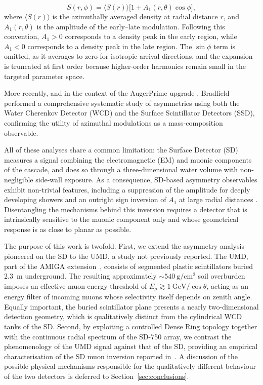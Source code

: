\documentclass[11pt,a4paper]{article}
\begin{document}
\begin{equation}
    S(r, \phi) = \langle S(r)\rangle \big[ 1 + A_1(r, \theta) \cos \phi \big] ,
    \label{eq:harmonic_fit}
\end{equation}
%
where $\langle S(r)\rangle$ is the azimuthally averaged density at radial distance $r$, and $A_1(r, \theta)$ is the amplitude of the early--late modulation. Following this convention, $A_1 > 0$ corresponds to a density peak in the early region, while $A_1 < 0$ corresponds to a density peak in the late region. The $\sin \phi$ term is omitted, as it averages to zero for isotropic arrival directions, and the expansion is truncated at first order because higher-order harmonics remain small in the targeted parameter space.

More recently, and in the context of the AugerPrime upgrade \cite{AugerPrime2016}, Bradfield \cite{BradfieldThesis} performed a comprehensive systematic study of asymmetries using both the Water Cherenkov Detector (WCD) and the Surface Scintillator Detectors (SSD), confirming the utility of azimuthal modulations as a mass-composition observable.

All of these analyses share a common limitation: the Surface Detector (SD) measures a signal combining the electromagnetic (EM) and muonic components of the cascade, and does so through a three-dimensional water volume with non-negligible side-wall exposure. As a consequence, SD-based asymmetry observables exhibit non-trivial features, including a suppression of the amplitude for deeply developing showers and an outright sign inversion of $A_1$ at large radial distances \cite{BradfieldThesis, Luce_ICRC2021, GAP2000_017}. Disentangling the mechanisms behind this inversion requires a detector that is intrinsically sensitive to the muonic component only and whose geometrical response is as close to planar as possible.

The purpose of this work is twofold. First, we extend the asymmetry analysis pioneered on the SD to the UMD, a study not previously reported. The UMD, part of the AMIGA extension~\cite{Botti2019, auger2020umd_infill}, consists of segmented plastic scintillators buried $2.3$~m underground. The resulting approximately $\sim 540~\mathrm{g/cm^2}$ soil overburden imposes an effective muon energy threshold of $E_\mu \gtrsim 1 ~\mathrm{GeV}/\cos\theta$, acting as an energy filter of incoming muons whose selectivity itself depends on zenith angle. Equally important, the buried scintillator plane presents a nearly two-dimensional detection geometry, which is qualitatively distinct from the cylindrical WCD tanks of the SD. Second, by exploiting a controlled Dense Ring topology together with the continuous radial spectrum of the SD-750 array, we contrast the phenomenology of the UMD signal against that of the SD, providing an empirical characterisation of the SD muon inversion reported in~\cite{Luce_ICRC2021, GAP2000_017}. A discussion of the possible physical mechanisms responsible for the qualitatively different behaviour of the two detectors is deferred to Section~\ref{sec:conclusions}.
\end{document}
